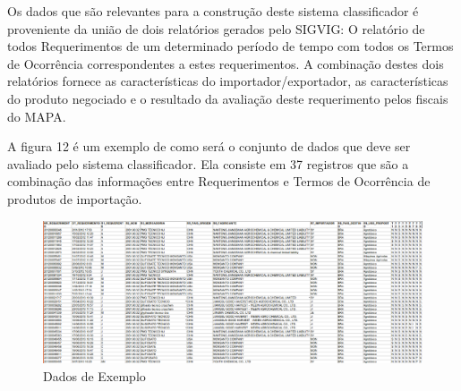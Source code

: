 Os dados que são relevantes para a construção deste sistema classificador é proveniente da união de dois relatórios gerados pelo SIGVIG: O relatório de todos Requerimentos de um determinado período de tempo com todos os Termos de Ocorrência correspondentes a estes requerimentos. A combinação destes dois relatórios fornece as características do importador/exportador, as características do produto negociado e o resultado da avaliação deste requerimento pelos fiscais do MAPA.

A figura 12 é um exemplo de como será o conjunto de dados que deve ser avaliado pelo sistema classificador. Ela consiste em 37 registros que são a combinação das informações entre Requerimentos e Termos de Ocorrência de produtos de importação.

\begin{figure}[!h]
\centering
\includegraphics[keepaspectratio=true,scale=0.30]
{figuras/tabelaMapa.eps}
\caption{Dados de Exemplo}
\label{tabelaMapa}
\end{figure}

